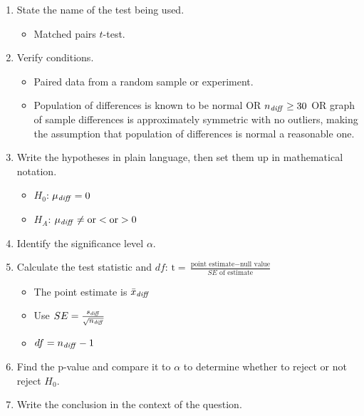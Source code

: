 \begin{termBox}{
\begin{enumerate}
\setlength{\itemsep}{0mm}
\item State the name of the test being used.\vspace{-1.5mm}
\begin{itemize}
\setlength{\itemsep}{0mm}
\item Matched pairs $t$-test.
\end{itemize}
\item Verify conditions.\vspace{-1.5mm}
\begin{itemize}
\setlength{\itemsep}{0mm}
\item Paired data from a random sample or experiment.
\item Population of differences is known to be normal OR $n_{\text{\emph{diff}}}\ge 30$ OR graph of sample differences is approximately symmetric with no outliers, making the assumption that population of differences is normal a reasonable one.
\end{itemize}
\item Write the hypotheses in plain language, then set them up in mathematical notation.\vspace{-1.5mm}
\begin{itemize}
\setlength{\itemsep}{0mm}
\item $H_0$: $\mu_{\text{\emph{diff}}}=0$
\item $H_A$: $\mu_{\text{\emph{diff}}} \ne \text{or} < \text{or} > 0$
\end{itemize}
\item Identify the significance level $\alpha$.
\item Calculate the test statistic and $df$: $\text{t} = \frac{\text{point estimate} - \text{null value}}{SE \text{ of estimate}}$
\begin{itemize}
\setlength{\itemsep}{0mm}
\item The point estimate is $\bar{x}_{\text{\emph{diff}}}$
\item Use $SE = \frac{s_{\text{\emph{diff}}}}{\sqrt{n_{\text{\emph{diff}}}}}$
\item $df=n_{\text{\emph{diff}}}-1$
\end{itemize}
\item Find the p-value and compare it to $\alpha$ to determine whether to reject or not reject $H_0$.
\item Write the conclusion in the context of the question.
\end{enumerate}}
\end{termBox}

